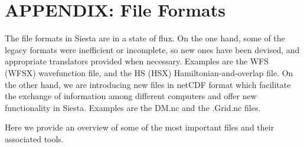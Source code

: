 \newpage
\section{APPENDIX: File Formats}

The file formats in Siesta are in a state of flux. On the one hand,
some of the legacy formats were inefficient or incomplete, so new ones
have been devised, and appropriate translators provided when
necessary.  Examples are the WFS (WFSX) wavefunction file, and the HS
(HSX) Hamiltonian-and-overlap file. On the other hand, we are
introducing new files in netCDF format which facilitate the exchange
of information among different computers and offer new functionality
in Siesta. Examples are the DM.nc and the .Grid.nc files.

Here we provide an overview of some of the most important files and their
associated tools.

